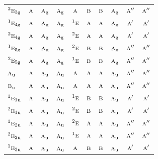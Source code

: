\documentclass[10pt,a4paper]{article}
\numberwithin{equation}{section}
\newcommand{\irr}[1]{\text{\normalfont\scshape #1}}
\newcommand{\conjpair}[1]{{}^{#1}}
\newcommand{\ptag}[1]{\mathrm{#1}}
\begin{document}
{\begin{longtable}{@{}lccccccccc@{}}
$\conjpair{2}\irr{e}_{3\ptag{g}}$ & $\irr{a}$ & $\irr{a}_{\ptag{g}}$ & $\irr{a}_{\ptag{g}}$ & $\irr{a}$ & $\irr{b}$ & $\irr{b}$ & $\irr{a}_{\ptag{g}}$ & $\irr{a}''$ & $\irr{a}''$\\
$\conjpair{1}\irr{e}_{4\ptag{g}}$ & $\irr{a}$ & $\irr{a}_{\ptag{g}}$ & $\irr{a}_{\ptag{g}}$ & $\conjpair{1}\irr{e}$ & $\irr{a}$ & $\irr{a}$ & $\irr{a}_{\ptag{g}}$ & $\irr{a}'$ & $\irr{a}'$\\
$\conjpair{2}\irr{e}_{4\ptag{g}}$ & $\irr{a}$ & $\irr{a}_{\ptag{g}}$ & $\irr{a}_{\ptag{g}}$ & $\conjpair{2}\irr{e}$ & $\irr{a}$ & $\irr{a}$ & $\irr{a}_{\ptag{g}}$ & $\irr{a}'$ & $\irr{a}'$\\
$\conjpair{1}\irr{e}_{5\ptag{g}}$ & $\irr{a}$ & $\irr{a}_{\ptag{g}}$ & $\irr{a}_{\ptag{g}}$ & $\conjpair{2}\irr{e}$ & $\irr{b}$ & $\irr{b}$ & $\irr{a}_{\ptag{g}}$ & $\irr{a}''$ & $\irr{a}''$\\
$\conjpair{2}\irr{e}_{5\ptag{g}}$ & $\irr{a}$ & $\irr{a}_{\ptag{g}}$ & $\irr{a}_{\ptag{g}}$ & $\conjpair{1}\irr{e}$ & $\irr{b}$ & $\irr{b}$ & $\irr{a}_{\ptag{g}}$ & $\irr{a}''$ & $\irr{a}''$\\
$\irr{a}_{\ptag{u}}$ & $\irr{a}$ & $\irr{a}_{\ptag{u}}$ & $\irr{a}_{\ptag{u}}$ & $\irr{a}$ & $\irr{a}$ & $\irr{a}$ & $\irr{a}_{\ptag{u}}$ & $\irr{a}''$ & $\irr{a}''$\\
$\irr{b}_{\ptag{u}}$ & $\irr{a}$ & $\irr{a}_{\ptag{u}}$ & $\irr{a}_{\ptag{u}}$ & $\irr{a}$ & $\irr{a}$ & $\irr{a}$ & $\irr{a}_{\ptag{u}}$ & $\irr{a}''$ & $\irr{a}''$\\
$\conjpair{1}\irr{e}_{1\ptag{u}}$ & $\irr{a}$ & $\irr{a}_{\ptag{u}}$ & $\irr{a}_{\ptag{u}}$ & $\conjpair{1}\irr{e}$ & $\irr{b}$ & $\irr{b}$ & $\irr{a}_{\ptag{u}}$ & $\irr{a}'$ & $\irr{a}'$\\
$\conjpair{2}\irr{e}_{1\ptag{u}}$ & $\irr{a}$ & $\irr{a}_{\ptag{u}}$ & $\irr{a}_{\ptag{u}}$ & $\conjpair{2}\irr{e}$ & $\irr{b}$ & $\irr{b}$ & $\irr{a}_{\ptag{u}}$ & $\irr{a}'$ & $\irr{a}'$\\
$\conjpair{1}\irr{e}_{2\ptag{u}}$ & $\irr{a}$ & $\irr{a}_{\ptag{u}}$ & $\irr{a}_{\ptag{u}}$ & $\conjpair{2}\irr{e}$ & $\irr{a}$ & $\irr{a}$ & $\irr{a}_{\ptag{u}}$ & $\irr{a}''$ & $\irr{a}''$\\
$\conjpair{2}\irr{e}_{2\ptag{u}}$ & $\irr{a}$ & $\irr{a}_{\ptag{u}}$ & $\irr{a}_{\ptag{u}}$ & $\conjpair{1}\irr{e}$ & $\irr{a}$ & $\irr{a}$ & $\irr{a}_{\ptag{u}}$ & $\irr{a}''$ & $\irr{a}''$\\
$\conjpair{1}\irr{e}_{3\ptag{u}}$ & $\irr{a}$ & $\irr{a}_{\ptag{u}}$ & $\irr{a}_{\ptag{u}}$ & $\irr{a}$ & $\irr{b}$ & $\irr{b}$ & $\irr{a}_{\ptag{u}}$ & $\irr{a}'$ & $\irr{a}'$\\

\end{longtable}}
\end{document}
